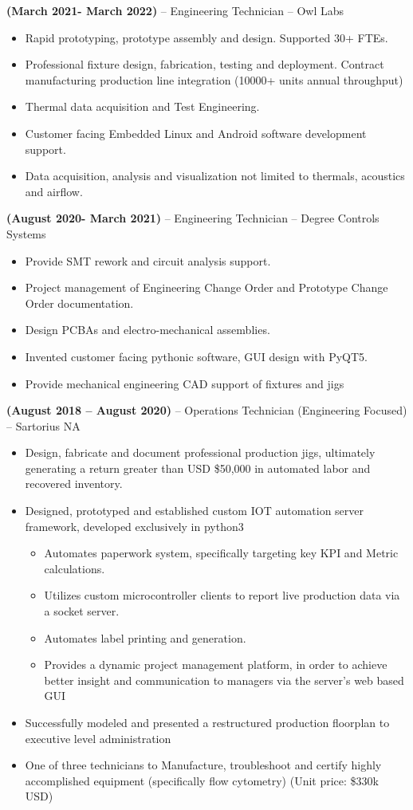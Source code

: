 \documentclass[11pt,a4paper]{article}
\newcommand{\jobentry}[2]{
  \textbf{#1} -- #2\\
}
\begin{document}
\jobentry{(March 2021- March 2022)}{Engineering Technician -- Owl Labs}
\begin{itemize}
\item Rapid prototyping, prototype assembly and design. Supported 30+ FTEs.
\item Professional fixture design, fabrication, testing and deployment. Contract manufacturing production line integration (10000+ units annual throughput)
\item Thermal data acquisition and Test Engineering.
\item Customer facing Embedded Linux and Android software development support.
\item Data acquisition, analysis and visualization not limited to thermals, acoustics and airflow.
\end{itemize}

\jobentry{(August 2020- March 2021)}{Engineering Technician -- Degree Controls Systems}
\begin{itemize}
\item Provide SMT rework and circuit analysis support.
\item Project management of Engineering Change Order and Prototype Change Order documentation.
\item Design PCBAs and electro-mechanical assemblies.
\item Invented customer facing pythonic software, GUI design with PyQT5.
\item Provide mechanical engineering CAD support of fixtures and jigs
\end{itemize}

\jobentry{(August 2018 -- August 2020)}{Operations Technician (Engineering Focused) -- Sartorius NA}
\begin{itemize}
\item Design, fabricate and document professional production jigs, ultimately generating a return greater than USD \$50,000 in automated labor and recovered inventory.
\item Designed, prototyped and established custom IOT automation server framework, developed exclusively in python3
  \begin{itemize}
  \item Automates paperwork system, specifically targeting key KPI and Metric calculations.
  \item Utilizes custom microcontroller clients to report live production data via a socket server.
  \item Automates label printing and generation.
  \item Provides a dynamic project management platform, in order to achieve better insight and communication to managers via the server's web based GUI
  \end{itemize}
\item Successfully modeled and presented a restructured production floorplan to executive level administration
\item One of three technicians to Manufacture, troubleshoot and certify highly accomplished equipment (specifically flow cytometry) (Unit price: \$330k USD)
\end{itemize}
\end{document}
